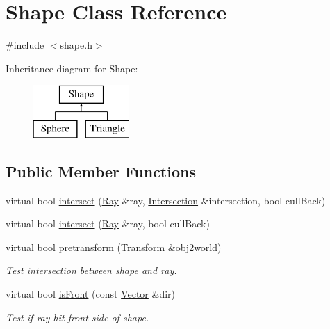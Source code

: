 \hypertarget{class_shape}{}\section{Shape Class Reference}
\label{class_shape}


{\ttfamily \#include $<$shape.\+h$>$}

Inheritance diagram for Shape\+:\begin{figure}[H]
\begin{center}
\leavevmode
\includegraphics[height=2.000000cm]{class_shape}
\end{center}
\end{figure}
\subsection*{Public Member Functions}
\begin{DoxyCompactItemize}
\item 
virtual bool \mbox{\hyperlink{class_shape_a06081ad5df190daf858f295bd8e8a0e1}{intersect}} (\mbox{\hyperlink{class_ray}{Ray}} \&ray, \mbox{\hyperlink{class_intersection}{Intersection}} \&intersection, bool cull\+Back)
\item 
virtual bool \mbox{\hyperlink{class_shape_a41cb78dcc1b919cdba2b7fbc0a1a0bc8}{intersect}} (\mbox{\hyperlink{class_ray}{Ray}} \&ray, bool cull\+Back)
\item 
\mbox{\label{class_shape_ad4f344dbda0fb8446805631c0c408a16}} 
virtual bool \mbox{\hyperlink{class_shape_ad4f344dbda0fb8446805631c0c408a16}{pretransform}} (\mbox{\hyperlink{class_transform}{Transform}} \&obj2world)
\begin{DoxyCompactList}\small\item\em Test intersection between shape and ray. \end{DoxyCompactList}\item 
\mbox{\label{class_shape_ac988eb692cfbfcaa1907491938a55b7a}} 
virtual bool \mbox{\hyperlink{class_shape_ac988eb692cfbfcaa1907491938a55b7a}{is\+Front}} (const \mbox{\hyperlink{struct_vector}{Vector}} \&dir)
\begin{DoxyCompactList}\small\item\em Test if ray hit front side of shape. \end{DoxyCompactList}\end{DoxyCompactItemize}



